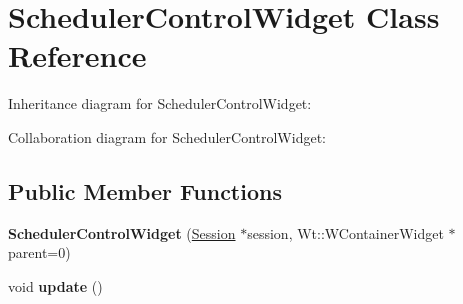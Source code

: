 \hypertarget{classSchedulerControlWidget}{}\section{Scheduler\+Control\+Widget Class Reference}
\label{classSchedulerControlWidget}


Inheritance diagram for Scheduler\+Control\+Widget\+:


Collaboration diagram for Scheduler\+Control\+Widget\+:
\subsection*{Public Member Functions}
\begin{DoxyCompactItemize}
\item 
{\bfseries Scheduler\+Control\+Widget} (\hyperlink{classSession}{Session} $\ast$session, Wt\+::\+W\+Container\+Widget $\ast$parent=0)\hypertarget{classSchedulerControlWidget_a88824ef71ef84e9e5bdb85ab3f4f9952}{}\label{classSchedulerControlWidget_a88824ef71ef84e9e5bdb85ab3f4f9952}

\item 
void {\bfseries update} ()\hypertarget{classSchedulerControlWidget_acca1c74b4dc6fa16c079da6b2e946f4b}{}\label{classSchedulerControlWidget_acca1c74b4dc6fa16c079da6b2e946f4b}

\end{DoxyCompactItemize}
